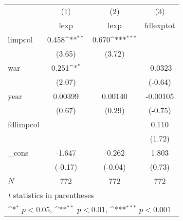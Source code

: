{
\def\sym#1{\ifmmode^{#1}\else\(^{#1}\)\fi}
\begin{tabular}{l*{3}{c}}
\hline\hline
            &\multicolumn{1}{c}{(1)}&\multicolumn{1}{c}{(2)}&\multicolumn{1}{c}{(3)}\\
            &\multicolumn{1}{c}{lexp}&\multicolumn{1}{c}{lexp}&\multicolumn{1}{c}{fdlexptot}\\
\hline
limpcol     &       0.458\sym{**} &       0.670\sym{***}&                     \\
            &      (3.65)         &      (3.72)         &                     \\
[1em]
war         &       0.251\sym{*}  &                     &     -0.0323         \\
            &      (2.07)         &                     &     (-0.64)         \\
[1em]
year        &     0.00399         &     0.00140         &    -0.00105         \\
            &      (0.67)         &      (0.29)         &     (-0.75)         \\
[1em]
fdlimpcol   &                     &                     &       0.110         \\
            &                     &                     &      (1.72)         \\
[1em]
\_cons      &      -1.647         &      -0.262         &       1.803         \\
            &     (-0.17)         &     (-0.04)         &      (0.73)         \\
\hline
\(N\)       &         772         &         772         &         772         \\
\hline\hline
\multicolumn{4}{l}{\footnotesize \textit{t} statistics in parentheses}\\
\multicolumn{4}{l}{\footnotesize \sym{*} \(p<0.05\), \sym{**} \(p<0.01\), \sym{***} \(p<0.001\)}\\
\end{tabular}
}
